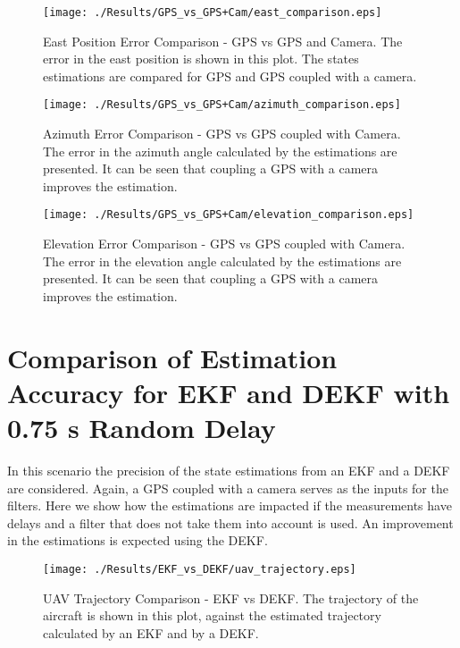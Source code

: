 \begin{figure}[H]
  \centering
  \texttt{[image: ./Results/GPS\_vs\_GPS+Cam/east\_comparison.eps]}
  \caption[East Position Error Comparison - GPS vs GPS and Camera]{East Position Error Comparison - GPS vs GPS and Camera. The error in the east position is shown in this plot. The states estimations are compared for GPS and GPS coupled with a camera.}
\end{figure}

\begin{figure}[H]
  \centering
  \texttt{[image: ./Results/GPS\_vs\_GPS+Cam/azimuth\_comparison.eps]}
  \caption[Azimuth Error Comparison - GPS vs GPS coupled with Camera]{Azimuth Error Comparison - GPS vs GPS coupled with Camera. The error in the azimuth angle calculated by the estimations are presented. It can be seen that coupling a GPS with a camera improves the estimation.}
\end{figure}
\begin{figure}[H]
  \centering
  \texttt{[image: ./Results/GPS\_vs\_GPS+Cam/elevation\_comparison.eps]}
  \caption[Elevation Error Comparison - GPS vs GPS coupled with Camera]{Elevation Error Comparison - GPS vs GPS coupled with Camera. The error in the elevation angle calculated by the estimations are presented. It can be seen that coupling a GPS with a camera improves the estimation.}
\end{figure}

\pagebreak

\section{Comparison of Estimation Accuracy for EKF and DEKF with 0.75 s Random Delay}
In this scenario the precision of the state estimations from an EKF and a DEKF are considered. Again, a GPS coupled with a camera serves as the inputs for the filters. Here we show how the estimations are impacted if the measurements have delays and a filter that does not take them into account is used. An improvement in the estimations is expected using the DEKF.

\begin{figure}[H]
  \centering
  \texttt{[image: ./Results/EKF\_vs\_DEKF/uav\_trajectory.eps]}
  \caption[UAV Trajectory Comparison - EKF vs DEKF]{UAV Trajectory Comparison - EKF vs DEKF. The trajectory of the aircraft is shown in this plot, against the estimated trajectory calculated by an EKF and by a DEKF.}
\end{figure}

